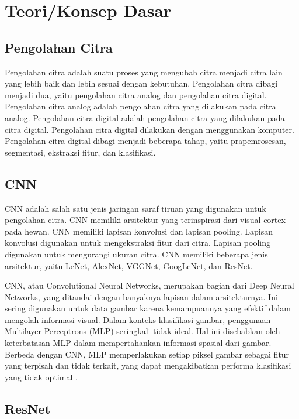 \section{Teori/Konsep Dasar}

\subsection{Pengolahan Citra}

Pengolahan citra adalah suatu proses yang mengubah citra menjadi citra lain yang lebih baik dan lebih sesuai dengan kebutuhan. Pengolahan citra dibagi menjadi dua, yaitu pengolahan citra analog dan pengolahan citra digital. Pengolahan citra analog adalah pengolahan citra yang dilakukan pada citra analog. Pengolahan citra digital adalah pengolahan citra yang dilakukan pada citra digital. Pengolahan citra digital dilakukan dengan menggunakan komputer. Pengolahan citra digital dibagi menjadi beberapa tahap, yaitu prapemrosesan, segmentasi, ekstraksi fitur, dan klasifikasi.

\subsection{CNN}

CNN adalah salah satu jenis jaringan saraf tiruan yang digunakan untuk pengolahan citra. CNN memiliki arsitektur yang terinspirasi dari visual cortex pada hewan. CNN memiliki lapisan konvolusi dan lapisan pooling. Lapisan konvolusi digunakan untuk mengekstraksi fitur dari citra. Lapisan pooling digunakan untuk mengurangi ukuran citra. CNN memiliki beberapa jenis arsitektur, yaitu LeNet, AlexNet, VGGNet, GoogLeNet, dan ResNet.

CNN, atau Convolutional Neural Networks, merupakan bagian dari Deep Neural Networks, yang ditandai dengan banyaknya lapisan dalam arsitekturnya. Ini sering digunakan untuk data gambar karena kemampuannya yang efektif dalam mengolah informasi visual. Dalam konteks klasifikasi gambar, penggunaan Multilayer Perceptrons (MLP) seringkali tidak ideal. Hal ini disebabkan oleh keterbatasan MLP dalam mempertahankan informasi spasial dari gambar. Berbeda dengan CNN, MLP memperlakukan setiap piksel gambar sebagai fitur yang terpisah dan tidak terkait, yang dapat mengakibatkan performa klasifikasi yang tidak optimal \parencite{AstutiSamsuryadi2018}.

\subsection{ResNet}


